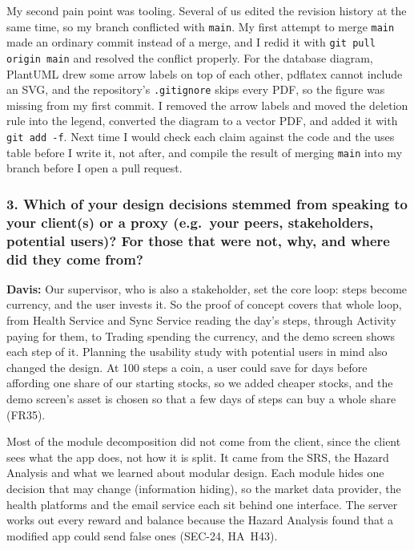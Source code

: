 \documentclass[12pt, titlepage]{article}
\begin{document}
My second pain point was tooling. Several of us edited the revision history at
the same time, so my branch conflicted with \texttt{main}. My first attempt to
merge \texttt{main} made an ordinary commit instead of a merge, and I redid it
with \texttt{git pull origin main} and resolved the conflict properly. For the
database diagram, PlantUML drew some arrow labels on top of each other,
pdflatex cannot include an SVG, and the repository's \texttt{.gitignore} skips
every PDF, so the figure was missing from my first commit. I removed the arrow
labels and moved the deletion rule into the legend, converted the diagram to a
vector PDF, and added it with \texttt{git add -f}. Next time I would check each
claim against the code and the uses table before I write it, not after, and
compile the result of merging \texttt{main} into my branch before I open a pull
request.

\subsubsection*{3. Which of your design decisions stemmed from speaking to your
client(s) or a proxy (e.g.\ your peers, stakeholders, potential users)? For
those that were not, why, and where did they come from?}

\noindent\textbf{Davis:} Our supervisor, who is also a stakeholder, set the
core loop: steps become currency, and the user invests it. So the proof of
concept covers that whole loop, from Health Service and Sync Service reading
the day's steps, through Activity paying for them, to Trading spending the
currency, and the demo screen shows each step of it. Planning the usability
study with potential users in mind also changed the design. At 100 steps a
coin, a user could save for days before affording one share of our starting
stocks, so we added cheaper stocks, and the demo screen's asset is chosen so
that a few days of steps can buy a whole share (FR35).

Most of the module decomposition did not come from the client, since the
client sees what the app does, not how it is split. It came from the SRS, the
Hazard Analysis and what we learned about modular design. Each module hides
one decision that may change (information hiding), so the market data
provider, the health platforms and the email service each sit behind one
interface. The server works out every reward and balance because the Hazard
Analysis found that a modified app could send false ones (SEC-24, HA~H43).\\
\end{document}
